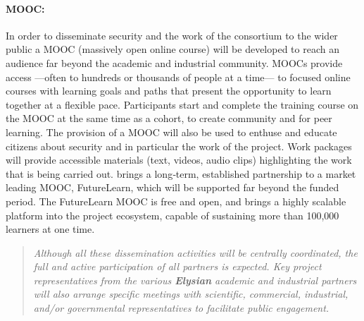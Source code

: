 \documentclass[a4paper,11pt]{article}
\newcommand{\project}[1]{\textbf{#1}\xspace}
\newcommand{\SECURITY}{\project{Elysian}}
\newcommand{\TheProject}{\SECURITY}
\begin{document}
 \paragraph{MOOC:}In order to disseminate security and the work of the consortium to the wider public a MOOC (massively open online course) will be developed to reach an audience far beyond the academic and industrial community.  MOOCs provide access ---often to hundreds or thousands of people at a time--- to focused online courses with learning goals and paths that present the opportunity to learn together at a flexible pace. Participants start and complete the training course on the MOOC at the same time as a cohort, to create community and for peer learning. The provision of a MOOC will also be
used to enthuse and educate citizens about security and in particular the work of the project.  Work packages will provide accessible materials (text, videos, audio clips) highlighting the work that is being carried out. \UODshort{} brings a long‐term, established partnership to a market leading MOOC, FutureLearn, which will be supported far beyond the funded period. The FutureLearn MOOC is free and open, and brings a highly scalable platform into the project ecosystem, capable of sustaining more than 100,000 learners at one time.


\begin{quote}

\emph{Although all these dissemination activities
will be centrally coordinated, the full and active participation of
all partners is expected. Key project representatives from
the various \TheProject{} academic and industrial
partners will also arrange specific meetings
with scientific, commercial, industrial, and/or
governmental representatives to facilitate public
engagement.}
\end{quote}
\end{document}
